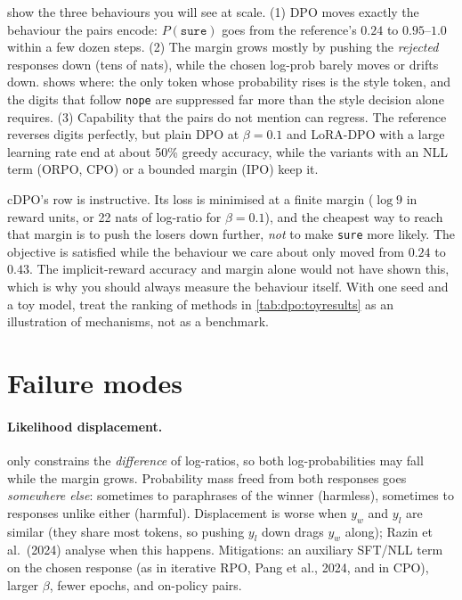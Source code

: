  show the three behaviours you will
see at scale. (1) DPO moves exactly the behaviour the pairs encode: $P(\texttt{sure})$ goes from
the reference's $0.24$ to $0.95$--$1.0$ within a few dozen steps. (2) The margin grows mostly by pushing
the \emph{rejected} responses down (tens of nats), while the chosen log-prob barely moves or drifts
down.  shows where: the only token whose probability rises is the style token,
and the digits that follow \texttt{nope} are suppressed far more than the style decision alone
requires. (3) Capability that the pairs do not mention can regress. The reference reverses digits
perfectly, but plain DPO at $\beta=0.1$ and LoRA-DPO with a large learning rate end at about 50\%
greedy accuracy, while the variants with an NLL term (ORPO, CPO) or a bounded margin (IPO) keep it.

cDPO's row is instructive. Its loss is minimised at a finite margin ($\log 9$ in reward units, or 22
nats of log-ratio for $\beta=0.1$), and the cheapest way to reach that margin is to push the losers
down further, \emph{not} to make \texttt{sure} more likely. The objective is satisfied while the
behaviour we care about only moved from $0.24$ to $0.43$. The implicit-reward accuracy and margin
alone would not have shown this, which is why you should always measure the behaviour itself.
With one seed and a toy model, treat the ranking of methods in \cref{tab:dpo:toyresults} as an
illustration of mechanisms, not as a benchmark.

\section{Failure modes}\label{sec:dpo:failures}

\paragraph{Likelihood displacement.}  only constrains the \emph{difference}
of log-ratios, so both log-probabilities may fall while the margin grows. Probability mass freed
from both responses goes \emph{somewhere else}: sometimes to paraphrases of the winner (harmless),
sometimes to responses unlike either (harmful). Displacement is worse when $y_w$ and $y_l$ are
similar (they share most tokens, so pushing $y_l$ down drags $y_w$ along); Razin et al.\ (2024)
analyse when this happens. Mitigations: an auxiliary SFT/NLL term on the chosen response (as in
iterative RPO, Pang et al., 2024, and in CPO), larger $\beta$, fewer epochs, and on-policy pairs.

